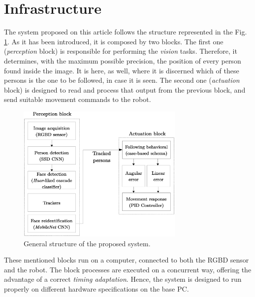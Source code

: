 \section{Infrastructure}

The system proposed on this article follows the structure represented in the Fig. \ref{fig:infra_scheme}. As it has been introduced, it is composed by two blocks. The first one (\emph{perception} block) is responsible for performing the \emph{vision} tasks. Therefore, it determines, with the maximum possible precision, the position of every person found inside the image. It is here, as well, where it is discerned which of these persons is the one to be followed, in case it is seen. The second one (\emph{actuation} block) is designed to read and process that output from the previous block, and send suitable movement commands to the robot.\\



\begin{figure}[h]
	\centering
	\includegraphics[width=3.2in]{images/system_schema}
	\caption{General structure of the proposed system.}
	\label{fig:infra_scheme}
\end{figure}



These mentioned blocks run on a computer, connected to both the RGBD sensor and the robot. The block processes are executed on a concurrent way, offering the advantage of a correct \emph{timing adaptation}. Hence, the system is designed to run properly on different hardware specifications on the base PC.